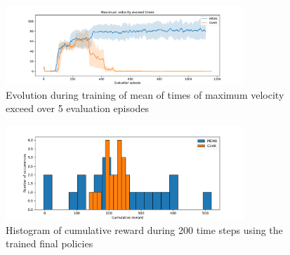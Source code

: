 \begin{figure}[ht]
    \centering
    \includegraphics[width=0.8\textwidth]{images/Cheetah_offpolicy_medium/times_exceedvel_withstds.pdf}
    \caption{Evolution during training of mean of times of maximum velocity exceed over 5 evaluation episodes}
    \label{vel_exceed_cheetah}

\end{figure}

\begin{figure}[ht]
    \centering
    \includegraphics[width=0.8\textwidth]{images/Cheetah_offpolicy_medium/hist_evaluation_numevalsteps200.pdf}
    \caption{Histogram of cumulative reward during 200 time steps using the trained final policies}
    \label{hist_cum_rewards200steps_cheetah}

\end{figure}